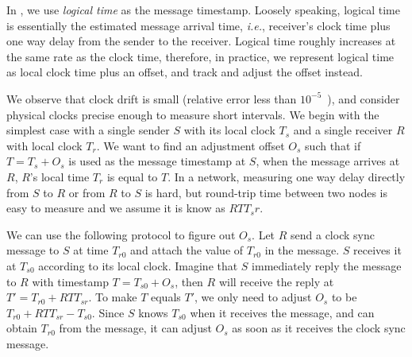  In \sys, we use \emph{logical time} as the message timestamp. Loosely speaking, logical time is essentially the estimated message arrival time, \emph{i.e.}, receiver's clock time plus one way delay from the sender to the receiver.
Logical time roughly increases at the same rate as the clock time, therefore, in practice, we represent logical time as local clock time plus an offset, and track and adjust the offset instead. 

We observe that clock drift is small (relative error less than $10^{-5}$~\cite{corbett2013spanner,geng2018exploiting}), and consider physical clocks precise enough to measure short intervals. We begin with the simplest case with a single sender $S$ with its local clock $T_s$ and a single receiver $R$ with local clock $T_r$. We want to find an adjustment offset $O_s$ such that if $T = T_s + O_s$ is used as the message timestamp at $S$, when the message arrives at $R$, $R$'s local time $T_r$ is equal to $T$. In a network, measuring one way delay directly from $S$ to $R$ or from $R$ to $S$ is hard, but round-trip time between two nodes is easy to measure and we assume it is know as $RTT_sr$.

We can use the following protocol to figure out $O_s$. Let $R$ send a clock sync message to $S$ at time $T_{r0}$ and attach the value of $T_{r0}$ in the message. $S$ receives it at $T_{s0}$ according to its local clock. Imagine that $S$ immediately reply the message to $R$ with timestamp $T = T_{s0} + O_s$, then $R$ will receive the reply at $T' = T_{r0} + RTT_{sr}$. To make $T$ equals $T'$, we only need to adjust $O_s$ to be $T_{r0} + RTT_{sr} - T_{s0}$. Since $S$ knows $T_{s0}$ when it receives the message, and can obtain $T_{r0}$ from the message, it can adjust $O_s$ as soon as it receives the clock sync message.



%

